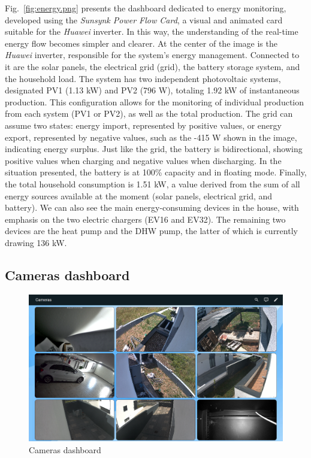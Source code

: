 \documentclass[graybox]{svmult}
\begin{document}
Fig.~\ref{fig:energy.png} presents the dashboard dedicated to energy monitoring, developed using the \textit{Sunsynk Power Flow Card}, a visual and animated card suitable for the \textit{Huawei} inverter. In this way, the understanding of the real-time energy flow becomes simpler and clearer.
At the center of the image is the \textit{Huawei} inverter, responsible for the system's energy management. Connected to it are the solar panels, the electrical grid (grid), the battery storage system, and the household load.
The system has two independent photovoltaic systems, designated PV1 (1.13 kW) and PV2 (796 W), totaling 1.92 kW of instantaneous production. This configuration allows for the monitoring of individual production from each system (PV1 or PV2), as well as the total production.
The grid can assume two states: energy import, represented by positive values, or energy export, represented by negative values, such as the -415 W shown in the image, indicating energy surplus.
Just like the grid, the battery is bidirectional, showing positive values when charging and negative values when discharging. In the situation presented, the battery is at 100\% capacity and in floating mode.
Finally, the total household consumption is 1.51 kW, a value derived from the sum of all energy sources available at the moment (solar panels, electrical grid, and battery). We can also see the main energy-consuming devices in the house, with emphasis on the two electric chargers (EV16 and EV32). The remaining two devices are the heat pump and the DHW pump, the latter of which is currently drawing 136 kW.

\subsection{Cameras dashboard}

\begin{figure}[H] 
	\centering
	\includegraphics[width=\textwidth]{nvr.png}
	\caption{Cameras dashboard}
	\label{fig:nvr.png}
\end{figure}
\end{document}
